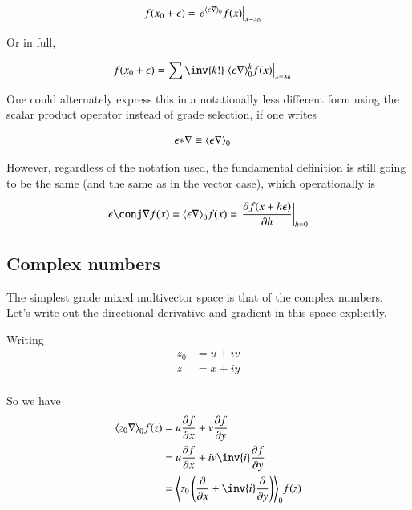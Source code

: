 \documentclass{article}
\newcommand{\stardot}[0]{{*}}
\begin{document}
\begin{align}\label{eqn:taylorsExponentialScalarProd}
f(x_0 + \epsilon) 
&= \left. e^{{\left\langle{{\epsilon \nabla}}\right\rangle}_{0}} f(x) \right\vert_{x=x_0} 
\end{align}

Or in full,

\begin{align}\label{eqn:taylorMultiScalarProd}
f(x_0 + \epsilon) 
&= \sum \inv{k!} \left. {\gpgradezero{\epsilon \grad}^k} f(x) \right\vert_{x=x_0}
\end{align}

One could alternately express this in a notationally less different form
using the scalar product operator instead of grade selection, if one writes

\begin{align*}
{\epsilon \stardot \grad} &\equiv \gpgradezero{\epsilon \grad} 
\end{align*}

However, regardless of the notation used, the fundamental definition 
is still going to be the same (and the same as in the vector case), which
operationally is

\begin{align*}
{\epsilon \conj \grad} f(x) = \gpgradezero{\epsilon \grad} f(x)
= \left. \PD{h}{f(x + h \epsilon)} \right\vert_{h=0}
\end{align*}

\subsection{ Complex numbers }

The simplest grade mixed multivector space is that of the complex numbers.  Let's write out the
directional derivative and gradient in this space explicitly.

Writing 
\begin{align*}
z_0 &= u + i v \\
z &= x + i y \\
\end{align*}

So we have
\begin{align*}
\gpgradezero{z_0 \grad} f(z) 
&= u \PD{x}{f} + v \PD{y}{f} \\
&= u \PD{x}{f} + i v \inv{i} \PD{y}{f} \\
&= \gpgradezero{ z_0 \left( \PD{x}{} + \inv{i} \PD{y}{} \right) } f(z) \\
\end{align*}
\end{document}
